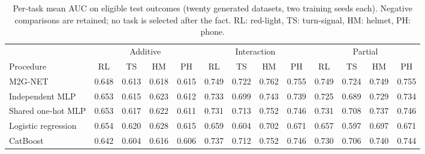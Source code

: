 \documentclass[9pt, conference, a4paper, compsocconf]{IEEEtran}
\begin{document}
\begin{table}[!t]
\caption{Per-task mean AUC on eligible test outcomes (twenty generated datasets, two training seeds each). Negative comparisons are retained; no task is selected after the fact. RL: red-light, TS: turn-signal, HM: helmet, PH: phone.}
\label{tab:pertask}
\centering\footnotesize\setlength{\tabcolsep}{3pt}
\begin{tabular}{lcccccccccccc}
\toprule
 & \multicolumn{4}{c}{Additive} & \multicolumn{4}{c}{Interaction} & \multicolumn{4}{c}{Partial} \\
\cmidrule(lr){2-5}\cmidrule(lr){6-9}\cmidrule(lr){10-13}
Procedure & RL & TS & HM & PH & RL & TS & HM & PH & RL & TS & HM & PH \\
\midrule
M2G-NET & 0.648 & 0.613 & 0.618 & 0.615 & 0.749 & 0.722 & 0.762 & 0.755 & 0.749 & 0.724 & 0.749 & 0.755 \\
Independent MLP & 0.653 & 0.615 & 0.623 & 0.612 & 0.733 & 0.699 & 0.743 & 0.739 & 0.725 & 0.689 & 0.729 & 0.734 \\
Shared one-hot MLP & 0.653 & 0.617 & 0.622 & 0.611 & 0.731 & 0.713 & 0.752 & 0.746 & 0.731 & 0.708 & 0.737 & 0.746 \\
Logistic regression & 0.654 & 0.620 & 0.628 & 0.615 & 0.659 & 0.604 & 0.702 & 0.671 & 0.657 & 0.597 & 0.697 & 0.671 \\
CatBoost & 0.642 & 0.604 & 0.616 & 0.606 & 0.737 & 0.712 & 0.752 & 0.746 & 0.730 & 0.706 & 0.740 & 0.744 \\
\bottomrule
\end{tabular}
\end{table}
\end{document}

